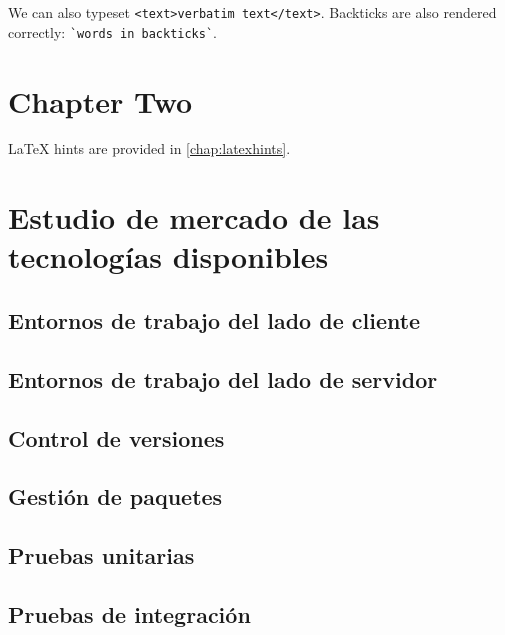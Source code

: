 \documentclass[
  a4paper,  %
  twoside,  %
  bibliography=totoc,
  headsepline,
  cleardoublepage=empty,
  parskip=half,
  draft=false
]{scrbook}
\begin{document}
We can also typeset \verb|<text>verbatim text</text>|.
Backticks are also rendered correctly: \verb|`words in backticks`|.

\chapter{Chapter Two}
\label{chap:k2}

LaTeX hints are provided in \cref{chap:latexhints}.

\chapter{Estudio de mercado de las tecnologías disponibles}
\label{chap:techMarketResearch}

\section{Entornos de trabajo del lado de cliente}



\section{Entornos de trabajo del lado de servidor}



\section{Control de versiones}



\section{Gestión de paquetes}



\section{Pruebas unitarias}



\section{Pruebas de integración}


\end{document}
